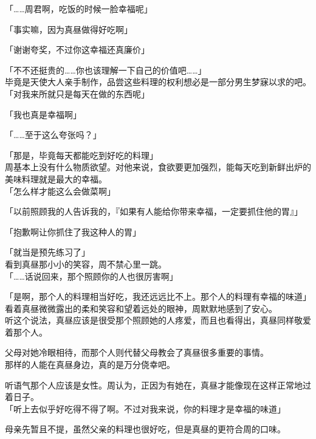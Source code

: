 「……周君啊，吃饭的时候一脸幸福呢」

「事实嘛，因为真昼做得好吃啊」

「谢谢夸奖，不过你这幸福还真廉价」

「不不还挺贵的……你也该理解一下自己的价值吧……」\\

毕竟是天使大人亲手制作，品尝这些料理的权利想必是一部分男生梦寐以求的吧。\\

「对我来所就只是每天在做的东西呢」

「我也真是幸福啊」

「……至于这么夸张吗？」

「那是，毕竟每天都能吃到好吃的料理」\\

周基本上没有什么物质欲望。对他来说，食欲要更加强烈，能每天吃到新鲜出炉的美味料理就是最大的幸福。\\

「怎么样才能这么会做菜啊」

「以前照顾我的人告诉我的，『如果有人能给你带来幸福，一定要抓住他的胃』」

「抱歉啊让你抓住了我这种人的胃」

「就当是预先练习了」\\

看到真昼那小小的笑容，周不禁心里一跳。\\

「……话说回来，那个照顾你的人也很厉害啊」

「是啊，那个人的料理相当好吃，我还远远比不上。那个人的料理有幸福的味道」\\

看着真昼微微露出的柔和笑容和望着远处的眼神，周默默地感到了安心。\\

听这个说法，真昼应该是很受那个照顾她的人疼爱，而且也看得出，真昼同样敬爱着那个人。

父母对她冷眼相待，而那个人则代替父母教会了真昼很多重要的事情。\\

那样的人能在真昼身边，真的是万分侥幸吧。

听语气那个人应该是女性。周认为，正因为有她在，真昼才能像现在这样正常地过着日子。\\

「听上去似乎好吃得不得了啊。不过对我来说，你的料理才是幸福的味道」

母亲先暂且不提，虽然父亲的料理也很好吃，但是真昼的更符合周的口味。\\


